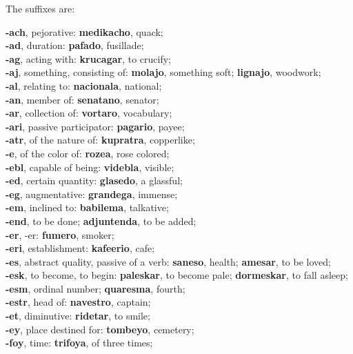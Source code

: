 \begin{center}The suffixes are:\end{center}
\textbf{-ach}, pejorative: \textbf{medikacho}, quack; \\ 
\textbf{-ad}, duration: \textbf{pafado}, fusillade; \\ 
\textbf{-ag}, acting with: \textbf{krucagar}, to crucify; \\ 
\textbf{-aj}, something, consisting of: \textbf{molajo}, something soft; \textbf{lignajo}, woodwork; \\ 
\textbf{-al}, relating to: \textbf{nacionala}, national; \\ 
\textbf{-an}, member of: \textbf{senatano}, senator; \\ 
\textbf{-ar}, collection of: \textbf{vortaro}, vocabulary; \\ 
\textbf{-ari}, passive participator: \textbf{pagario}, payee; \\ 
\textbf{-atr}, of the nature of: \textbf{kupratra}, copperlike; \\ 
\textbf{-e}, of the color of: \textbf{rozea}, rose colored; \\ 
\textbf{-ebl}, capable of being: \textbf{videbla}, visible; \\ 
\textbf{-ed}, certain quantity: \textbf{glasedo}, a glassful; \\ 
\textbf{-eg}, augmentative: \textbf{grandega}, immense; \\ 
\textbf{-em}, inclined to: \textbf{babilema}, talkative; \\ 
\textbf{-end}, to be done; \textbf{adjuntenda}, to be added; \\ 
\textbf{-er}, -er: \textbf{fumero}, smoker; \\ 
\textbf{-eri}, establishment: \textbf{kafeerio}, cafe; \\ 
\textbf{-es}, abstract quality, passive of a verb: \textbf{saneso}, health; \textbf{amesar}, to be loved; \\ 
\textbf{-esk}, to become, to begin: \textbf{paleskar}, to become pale; \textbf{dormeskar}, to fall asleep; \\ 
\textbf{-esm}, ordinal number; \textbf{quaresma}, fourth; \\ 
\textbf{-estr}, head of: \textbf{navestro}, captain; \\ 
\textbf{-et}, diminutive: \textbf{ridetar}, to smile; \\ 
\textbf{-ey}, place destined for: \textbf{tombeyo}, cemetery; \\ 
\textbf{-foy}, time: \textbf{trifoya}, of three times; \\ 
